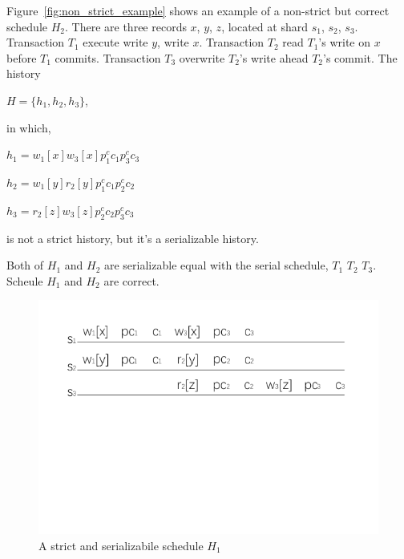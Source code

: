 \documentclass[conference]{IEEEtran}
\begin{document}
Figure~\ref{fig:non_strict_example} shows an example of a non-strict but correct schedule ${H_2}$.
There are three records ${x}$, ${y}$, ${z}$, located at shard ${s_1}$, ${s_2}$, ${s_3}$.
Transaction ${T_1}$ execute write ${y}$, write ${x}$.
Transaction ${T_2}$ read ${T_1}$'s write on ${x}$ before ${T_1}$ commits.
Transaction ${T_3}$ overwrite ${T_2}$'s write ahead ${T_2}$'s commit.
The history 

\begin{center}
  ${H = \{h_1, h_2, h_3\}}$,

\end{center}

in which, 

\begin{center}
  ${h_1=w_1[x]w_3[x]p^c_1c_1p^c_3c_3}$

${h_2=w_1[y]r_2[y]p^c_1c_1p^c_2c_2}$

${h_3=r_2[z]w_3[z]p^c_2c_2p^c_3c_3 }$ 
\end{center}


is not a strict history, but it's a serializable history. 

Both of ${H_1}$ and ${H_2}$ are serializable equal with the serial schedule, ${T_1}$ ${T_2}$ ${T_3}$.
Scheule ${H_1}$ and ${H_2}$ are correct.


\begin{figure}[htbp]
  \centerline{\includegraphics[scale=1]{figure/schedule_strict.pdf}}
  \caption{A strict and serializabile schedule ${H_1}$}
  \label{fig:strict_example}
\end{figure}
\end{document}
